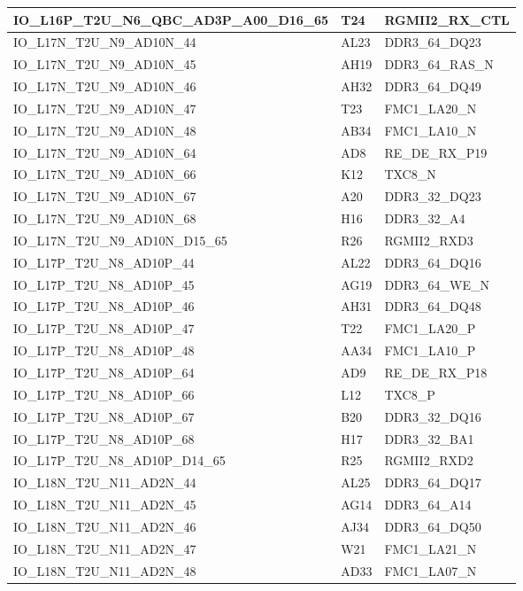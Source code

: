 \begin{footnotesize}
\begin{longtable}{|p{7cm}|p{1cm}|p{5cm}|}
IO\_L16P\_T2U\_N6\_QBC\_AD3P\_A00\_D16\_65	&	T24	&	RGMII2\_RX\_CTL	\\ \hline
IO\_L17N\_T2U\_N9\_AD10N\_44	&	AL23	&	DDR3\_64\_DQ23	\\ \hline
IO\_L17N\_T2U\_N9\_AD10N\_45	&	AH19	&	DDR3\_64\_RAS\_N	\\ \hline
IO\_L17N\_T2U\_N9\_AD10N\_46	&	AH32	&	DDR3\_64\_DQ49	\\ \hline
IO\_L17N\_T2U\_N9\_AD10N\_47	&	T23	&	FMC1\_LA20\_N	\\ \hline
IO\_L17N\_T2U\_N9\_AD10N\_48	&	AB34	&	FMC1\_LA10\_N	\\ \hline
IO\_L17N\_T2U\_N9\_AD10N\_64	&	AD8	&	RE\_DE\_RX\_P19	\\ \hline
IO\_L17N\_T2U\_N9\_AD10N\_66	&	K12	&	TXC8\_N	\\ \hline
IO\_L17N\_T2U\_N9\_AD10N\_67	&	A20	&	DDR3\_32\_DQ23	\\ \hline
IO\_L17N\_T2U\_N9\_AD10N\_68	&	H16	&	DDR3\_32\_A4	\\ \hline
IO\_L17N\_T2U\_N9\_AD10N\_D15\_65	&	R26	&	RGMII2\_RXD3	\\ \hline
IO\_L17P\_T2U\_N8\_AD10P\_44	&	AL22	&	DDR3\_64\_DQ16	\\ \hline
IO\_L17P\_T2U\_N8\_AD10P\_45	&	AG19	&	DDR3\_64\_WE\_N	\\ \hline
IO\_L17P\_T2U\_N8\_AD10P\_46	&	AH31	&	DDR3\_64\_DQ48	\\ \hline
IO\_L17P\_T2U\_N8\_AD10P\_47	&	T22	&	FMC1\_LA20\_P	\\ \hline
IO\_L17P\_T2U\_N8\_AD10P\_48	&	AA34	&	FMC1\_LA10\_P	\\ \hline
IO\_L17P\_T2U\_N8\_AD10P\_64	&	AD9	&	RE\_DE\_RX\_P18	\\ \hline
IO\_L17P\_T2U\_N8\_AD10P\_66	&	L12	&	TXC8\_P	\\ \hline
IO\_L17P\_T2U\_N8\_AD10P\_67	&	B20	&	DDR3\_32\_DQ16	\\ \hline
IO\_L17P\_T2U\_N8\_AD10P\_68	&	H17	&	DDR3\_32\_BA1	\\ \hline
IO\_L17P\_T2U\_N8\_AD10P\_D14\_65	&	R25	&	RGMII2\_RXD2	\\ \hline
IO\_L18N\_T2U\_N11\_AD2N\_44	&	AL25	&	DDR3\_64\_DQ17	\\ \hline
IO\_L18N\_T2U\_N11\_AD2N\_45	&	AG14	&	DDR3\_64\_A14	\\ \hline
IO\_L18N\_T2U\_N11\_AD2N\_46	&	AJ34	&	DDR3\_64\_DQ50	\\ \hline
IO\_L18N\_T2U\_N11\_AD2N\_47	&	W21	&	FMC1\_LA21\_N	\\ \hline
IO\_L18N\_T2U\_N11\_AD2N\_48	&	AD33	&	FMC1\_LA07\_N	\\ \hline

\end{longtable}
\end{footnotesize}
